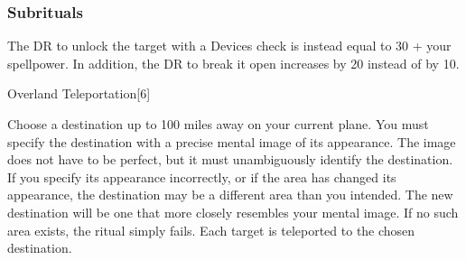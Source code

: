 \subsubsection{Subrituals}
The DR to unlock the target with a Devices check is instead equal to 30 + your spellpower.
In addition, the DR to break it open increases by 20 instead of by 10.
\begin{spellsection}{Overland Teleportation}[6]
\begin{spellcontent}
\begin{spelltargetinginfo}
\end{spelltargetinginfo}
\begin{spelleffects}
\spellspecial
Choose a destination up to 100 miles away on your current plane.
You must specify the destination with a precise mental image of its appearance.
The image does not have to be perfect, but it must unambiguously identify the destination.
If you specify its appearance incorrectly, or if the area has changed its appearance, the destination may be a different area than you intended.
The new destination will be one that more closely resembles your mental image.
If no such area exists, the ritual simply fails.
\spelleffect
Each target is teleported to the chosen destination.
\end{spelleffects}
\end{spellcontent}
\begin{spellfooter}
\end{spellfooter}
\begin{spellsubcontent}
\end{spellsubcontent}
\end{spellsection}
